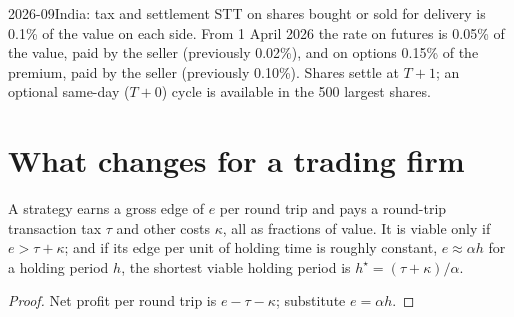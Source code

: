 \begin{dated}{2026-09}{India: tax and settlement}\label{dat:m1:asian-and-emerging-equity-markets:india}
STT on shares bought or sold for delivery is 0.1\% of the value on each side.
From 1 April 2026 the rate on futures is 0.05\% of the value, paid by the
seller (previously 0.02\%), and on options 0.15\% of the premium, paid by the
seller (previously 0.10\%). Shares settle at $T{+}1$; an optional same-day
($T{+}0$) cycle is available in the 500 largest shares.
\end{dated}

\begin{omfigure}

\end{omfigure}

\section{What changes for a trading firm}

\begin{proposition}\label{prop:m1:asian-and-emerging-equity-markets:floor}
A strategy earns a gross edge of $e$ per round trip and pays a round-trip
transaction tax $\tau$ and other costs $\kappa$, all as fractions of value.
It is viable only if $e > \tau + \kappa$; and if its edge per unit of holding
time is roughly constant, $e \approx \alpha h$ for a holding period $h$, the
shortest viable holding period is $h^\star = (\tau+\kappa)/\alpha$.
\end{proposition}
\begin{proof}
Net profit per round trip is $e - \tau - \kappa$; substitute $e = \alpha h$.
\end{proof}

